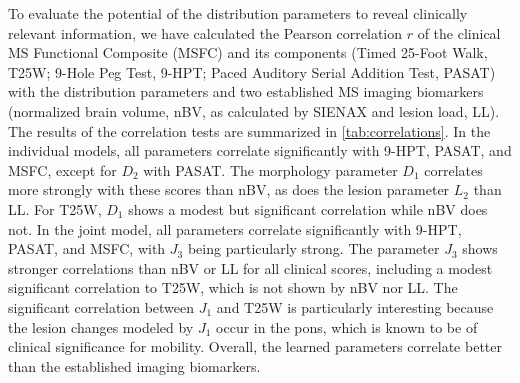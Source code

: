 To evaluate the potential of the distribution parameters to reveal clinically
relevant information, we have calculated the Pearson correlation $r$ of the
clinical MS Functional Composite (MSFC) \cite{fischer1999} and its components
(Timed 25-Foot Walk, T25W; 9-Hole Peg Test, 9-HPT; Paced Auditory Serial
Addition Test, PASAT) with the distribution parameters and two established MS
imaging biomarkers (normalized brain volume, nBV, as calculated by SIENAX
\cite{smith2002} and lesion load, LL). The results of the correlation tests are
summarized in \ref{tab:correlations}. In the individual models, all
parameters correlate significantly with 9-HPT, PASAT, and MSFC, except for $D_2$
with PASAT. The morphology parameter $D_1$ correlates more strongly with these
scores than nBV, as does the lesion parameter $L_2$ than LL. For T25W, $D_1$
shows a modest but significant correlation while nBV does not. In the joint
model, all parameters correlate significantly with 9-HPT, PASAT, and MSFC, with
$J_3$ being particularly strong. The parameter $J_3$ shows stronger correlations
than nBV or LL for all clinical scores, including a modest significant
correlation to T25W, which is not shown by nBV nor LL. The significant
correlation between $J_1$ and T25W is particularly interesting because the
lesion changes modeled by $J_1$ occur in the pons, which is known to be of
clinical significance for mobility. Overall, the learned parameters correlate
better than the established imaging biomarkers.

